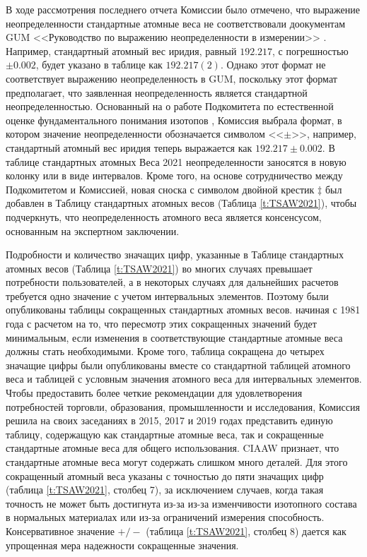 \documentclass[a5paper,openany]{book}
\begin{document}
В ходе рассмотрения последнего отчета Комиссии было отмечено, что выражение неопределенности стандартные атомные веса не соответствовали доокументам  GUM <<Руководство по выражению неопределенности в
измерении>> \cite{GUM2011}.
Например, стандартный атомный вес иридия, равный $192.217$, с погрешностью
$\pm 0.002$, будет указано в таблице как $192.217(2)$. Однако этот формат не соответствует выражению
неопределенность в GUM, поскольку этот формат предполагает, что заявленная неопределенность является стандартной неопределенностью. Основанный на о работе Подкомитета по естественной оценке фундаментального понимания изотопов \cite{IUPACMS2020},
Комиссия выбрала формат, в котором значение неопределенности обозначается символом <<$\pm$>>, например,
стандартный атомный вес иридия теперь выражается как $ 192.217 \pm 0.002 $. В таблице стандартных атомных
Веса 2021 неопределенности заносятся в новую колонку или в виде интервалов. Кроме того, на основе
сотрудничество между Подкомитетом и Комиссией, новая сноска с символом двойной крестик $\ddag$
был добавлен в Таблицу стандартных атомных весов (Таблица \ref{t:TSAW2021}), чтобы подчеркнуть, что неопределенность атомного веса
является консенсусом, основанным на экспертном заключении.

Подробности и количество значащих цифр, указанные в Таблице стандартных атомных весов (Таблица \ref{t:TSAW2021})
во многих случаях превышает потребности пользователей, а в некоторых случаях для дальнейших расчетов требуется одно значение
с учетом интервальных элементов. Поэтому были опубликованы таблицы сокращенных стандартных атомных весов.
начиная с 1981 года с расчетом на то, что пересмотр этих сокращенных значений будет минимальным, если изменения в
соответствующие стандартные атомные веса должны стать необходимыми. Кроме того, таблица сокращена до четырех
значащие цифры были опубликованы вместе со стандартной таблицей атомного веса и таблицей с условным
значения атомного веса для интервальных элементов.
Чтобы предоставить более четкие рекомендации для удовлетворения потребностей торговли, образования, промышленности и
исследования, Комиссия решила на своих заседаниях в 2015, 2017 и 2019 годах представить единую таблицу, содержащую
как стандартные атомные веса, так и сокращенные стандартные атомные веса для общего использования. CIAAW
признает, что стандартные атомные веса могут содержать слишком много деталей. Для этого сокращенный атомный
веса указаны с точностью до пяти значащих цифр (таблица \ref{t:TSAW2021}, столбец 7), за исключением случаев, когда такая точность не может быть достигнута из-за
из-за изменчивости изотопного состава в нормальных материалах или из-за ограничений измерения
способность. Консервативное значение $+/-$ (таблица \ref{t:TSAW2021}, столбец 8) дается как упрощенная мера надежности
сокращенные значения.
\end{document}
